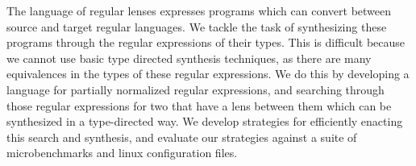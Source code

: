 The language of regular lenses expresses programs which can convert between
source and target regular languages.
We tackle the task of synthesizing these programs through the regular expressions
of their types.
This is difficult because we cannot use basic type directed synthesis techniques,
as there are many equivalences in the types of these regular expressions.
We do this by developing a language for partially normalized regular expressions,
and searching through those regular expressions for two that have a lens between
them which can be synthesized in a type-directed way.
We develop strategies for efficiently enacting this search and synthesis,
and evaluate our strategies against a suite of microbenchmarks and linux
configuration files.

